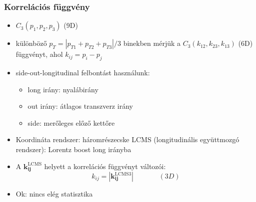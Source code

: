 \documentclass{beamer}
\begin{document}
\begin{frame}
\frametitle{Korrelációs függvény}
\begin{itemize}
\setlength{\itemsep}{10pt}
\item $C_3(p_1,p_2,p_3)$ (9D) 

\item különböző $p_T=|p_{T1}+p_{T2}+p_{T3}|/3$ binekben mérjük a $C_3(k_{12}, k_{23}, k_{13})$ (6D) függvényt, ahol $k_{ij}=p_i-p_j$ 
\item side-out-longitudinal felbontást használunk:
\begin{itemize}
\setlength{\itemsep}{4pt}
\item long irány: nyalábirány
\item out irány: átlagos transzverz irány 
\item side: merőleges előző kettőre
\end{itemize}
\item Koordináta rendszer: háromrészecske LCMS (longitudinális együttmozgó rendszer): Lorentz boost long irányba
\item A $\bm{k_{ij}^{\mathrm{LCMS}}}$ helyett a korrelációs függvényt változói:
\begin{equation*}
k_{ij}=|\bm{k_{ij}^{\mathrm{LCMS3}}}|\;\;\;\;\;\;\;\;\;\;\;\;\;(3D)
\end{equation*}
\item Ok: nincs elég statisztika
\end{itemize}
\end{frame}


\end{document}
